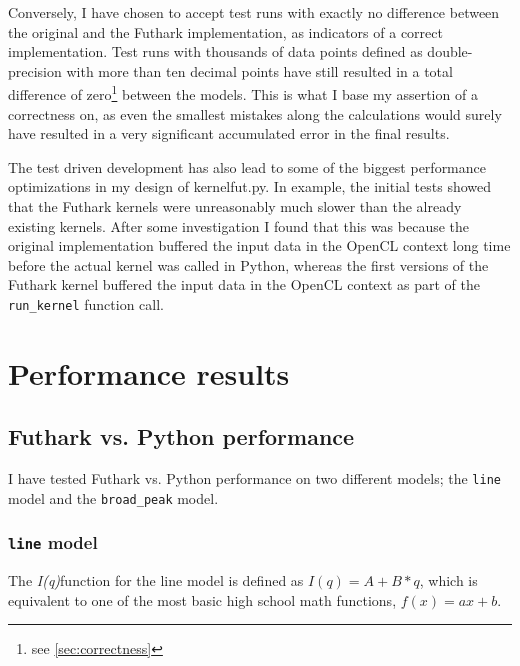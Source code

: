 \documentclass[11pt]{article}
\newcommand{\iq}{\textit{I(q)}}
\begin{document}
Conversely, I have chosen to accept test runs with exactly no difference
between the original and the Futhark implementation, as indicators of a
correct implementation. 
Test runs with thousands of data points defined as double-precision
with more than ten decimal points have still resulted in a total difference of
zero\footnote{see \ref{sec:correctness}} between the models.
This is what I base my assertion of a correctness on, as even the smallest 
mistakes along the calculations would surely have resulted in a very significant
accumulated error in the final results.

The test driven development has also lead to some of the biggest performance
optimizations in my design of kernelfut.py.
In example, the initial tests showed that the Futhark kernels were unreasonably
much slower than the already existing kernels. After some investigation I found
that this was because the original implementation buffered the input data in the
OpenCL context long time before the actual kernel was called in Python, whereas
the first versions of the Futhark kernel buffered the input data in the OpenCL
context as part of the \texttt{run\_kernel} function call.

\section{Performance results}
\label{performance}
\subsection{Futhark vs. Python performance}
I have tested Futhark vs. Python performance on two different models; 
the \texttt{line} model and the \texttt{broad\_peak} model.

\subsubsection{\texttt{line} model}
The \iq function for the line model is defined as $I(q) = A + B*q$, which is
equivalent to one of the most basic high school math functions, $f(x) = ax + b$.
\end{document}
